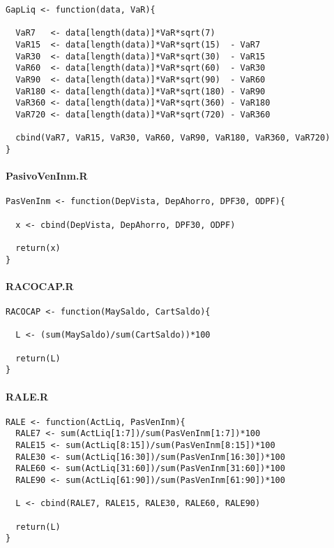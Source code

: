 \documentclass[]{article}
\begin{document}
\begin{verbatim}
GapLiq <- function(data, VaR){
  
  VaR7   <- data[length(data)]*VaR*sqrt(7)
  VaR15  <- data[length(data)]*VaR*sqrt(15)  - VaR7
  VaR30  <- data[length(data)]*VaR*sqrt(30)  - VaR15
  VaR60  <- data[length(data)]*VaR*sqrt(60)  - VaR30
  VaR90  <- data[length(data)]*VaR*sqrt(90)  - VaR60
  VaR180 <- data[length(data)]*VaR*sqrt(180) - VaR90
  VaR360 <- data[length(data)]*VaR*sqrt(360) - VaR180
  VaR720 <- data[length(data)]*VaR*sqrt(720) - VaR360
  
  cbind(VaR7, VaR15, VaR30, VaR60, VaR90, VaR180, VaR360, VaR720)
}
\end{verbatim}

\hypertarget{pasivoveninm.r}{%
\paragraph{PasivoVenInm.R}\label{pasivoveninm.r}}

\begin{verbatim}
PasVenInm <- function(DepVista, DepAhorro, DPF30, ODPF){
  
  x <- cbind(DepVista, DepAhorro, DPF30, ODPF)
  
  return(x)
}
\end{verbatim}

\hypertarget{racocap.r}{%
\paragraph{RACOCAP.R}\label{racocap.r}}

\begin{verbatim}
RACOCAP <- function(MaySaldo, CartSaldo){
  
  L <- (sum(MaySaldo)/sum(CartSaldo))*100
  
  return(L)
}
\end{verbatim}

\hypertarget{rale.r}{%
\paragraph{RALE.R}\label{rale.r}}

\begin{verbatim}
RALE <- function(ActLiq, PasVenInm){
  RALE7 <- sum(ActLiq[1:7])/sum(PasVenInm[1:7])*100
  RALE15 <- sum(ActLiq[8:15])/sum(PasVenInm[8:15])*100
  RALE30 <- sum(ActLiq[16:30])/sum(PasVenInm[16:30])*100
  RALE60 <- sum(ActLiq[31:60])/sum(PasVenInm[31:60])*100
  RALE90 <- sum(ActLiq[61:90])/sum(PasVenInm[61:90])*100
  
  L <- cbind(RALE7, RALE15, RALE30, RALE60, RALE90)
  
  return(L)
}
\end{verbatim}
\end{document}
